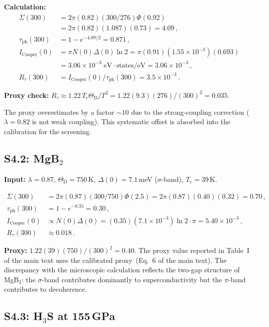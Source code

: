 \documentclass[prb,twocolumn,superscriptaddress,longbibliography,floatfix]{revtex4-2}
\newcommand{\tauasym}{\tau}
\newcommand{\taudec}{\tauasym_{\mathrm{ph}}}
\newcommand{\Icoop}{I_{\mathrm{Cooper}}}
\newcommand{\Rtau}{R_{\tauasym}}
\newcommand{\Tc}{T_{\mathrm{c}}}
\newcommand{\ThetaD}{\Theta_{\mathrm{D}}}
\begin{document}
\textbf{Calculation:}
\begin{align}
  \overline{\Sigma}(300) &= 2\pi(0.82)(300/276)\Phi(0.92) \nonumber\\
  &= 2\pi(0.82)(1.087)(0.73) = 4.09\,, \\
  \taudec(300) &= 1 - e^{-4.09/2} = 0.871\,, \\
  \Icoop(0) &= \pi N(0)\Delta(0)\ln 2 = \pi(0.91)(1.55\times 10^{-3})(0.693) \nonumber\\
  &= 3.06 \times 10^{-3}\;\text{eV}\cdot\text{states/eV} = 3.06 \times 10^{-3}\,, \\
  \Rtau(300) &= \Icoop(0)/\taudec(300) = 3.5 \times 10^{-3}\,.
\end{align}

\textbf{Proxy check:}
$\Rtau \approx 1.22\, \Tc\ThetaD/T^2 = 1.22(9.3)(276)/(300)^2 = 0.035$.

The proxy overestimates by a factor $\sim 10$ due to the
strong-coupling correction ($\lambda = 0.82$ is not weak coupling).
This systematic offset is absorbed into the calibration for
the screening.

\subsection{S4.2: MgB$_2$}

\textbf{Input:}
$\lambda = 0.87$, $\ThetaD = 750\,$K, $\Delta(0) = 7.1\,$meV
($\sigma$-band), $\Tc = 39\,$K.

\begin{align}
  \overline{\Sigma}(300) &= 2\pi(0.87)(300/750)\Phi(2.5)
  = 2\pi(0.87)(0.40)(0.32) = 0.70\,, \\
  \taudec(300) &= 1 - e^{-0.35} = 0.30\,, \\
  \Icoop(0) &\propto N(0)\Delta(0) = (0.35)(7.1\times 10^{-3})\ln 2\cdot\pi = 5.40\times 10^{-3}\,, \\
  \Rtau(300) &\approx 0.018\,.
\end{align}

\textbf{Proxy:}
$1.22(39)(750)/(300)^2 = 0.40$.
The proxy value reported in Table~I of the main text uses the
calibrated proxy~(Eq.~6 of the main text).  The discrepancy with
the microscopic calculation reflects the two-gap structure of
MgB$_2$: the $\sigma$-band contributes dominantly to
superconductivity but the $\pi$-band contributes to decoherence.

\subsection{S4.3: H$_3$S at 155\,GPa}
\end{document}
